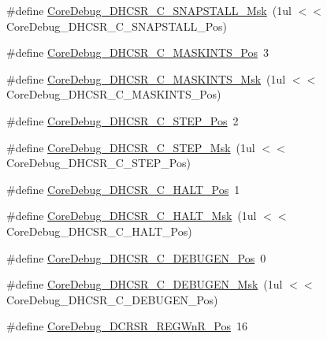 \begin{DoxyCompactItemize}
\item 
\#define \hyperlink{group___c_m_s_i_s___c_m3___core_debug_ga53aa99b2e39a67622f3b9973e079c2b4}{Core\-Debug\-\_\-\-D\-H\-C\-S\-R\-\_\-\-C\-\_\-\-S\-N\-A\-P\-S\-T\-A\-L\-L\-\_\-\-Msk}~(1ul $<$$<$ Core\-Debug\-\_\-\-D\-H\-C\-S\-R\-\_\-\-C\-\_\-\-S\-N\-A\-P\-S\-T\-A\-L\-L\-\_\-\-Pos)
\item 
\#define \hyperlink{group___c_m_s_i_s___c_m3___core_debug_ga0d2907400eb948a4ea3886ca083ec8e3}{Core\-Debug\-\_\-\-D\-H\-C\-S\-R\-\_\-\-C\-\_\-\-M\-A\-S\-K\-I\-N\-T\-S\-\_\-\-Pos}~3
\item 
\#define \hyperlink{group___c_m_s_i_s___c_m3___core_debug_ga77fe1ef3c4a729c1c82fb62a94a51c31}{Core\-Debug\-\_\-\-D\-H\-C\-S\-R\-\_\-\-C\-\_\-\-M\-A\-S\-K\-I\-N\-T\-S\-\_\-\-Msk}~(1ul $<$$<$ Core\-Debug\-\_\-\-D\-H\-C\-S\-R\-\_\-\-C\-\_\-\-M\-A\-S\-K\-I\-N\-T\-S\-\_\-\-Pos)
\item 
\#define \hyperlink{group___c_m_s_i_s___c_m3___core_debug_gae1fc39e80de54c0339cbb1b298a9f0f9}{Core\-Debug\-\_\-\-D\-H\-C\-S\-R\-\_\-\-C\-\_\-\-S\-T\-E\-P\-\_\-\-Pos}~2
\item 
\#define \hyperlink{group___c_m_s_i_s___c_m3___core_debug_gae6bda72fbd32cc5734ff3542170dc00d}{Core\-Debug\-\_\-\-D\-H\-C\-S\-R\-\_\-\-C\-\_\-\-S\-T\-E\-P\-\_\-\-Msk}~(1ul $<$$<$ Core\-Debug\-\_\-\-D\-H\-C\-S\-R\-\_\-\-C\-\_\-\-S\-T\-E\-P\-\_\-\-Pos)
\item 
\#define \hyperlink{group___c_m_s_i_s___c_m3___core_debug_gaddf1d43f8857e4efc3dc4e6b15509692}{Core\-Debug\-\_\-\-D\-H\-C\-S\-R\-\_\-\-C\-\_\-\-H\-A\-L\-T\-\_\-\-Pos}~1
\item 
\#define \hyperlink{group___c_m_s_i_s___c_m3___core_debug_ga1d905a3aa594eb2e8bb78bcc4da05b3f}{Core\-Debug\-\_\-\-D\-H\-C\-S\-R\-\_\-\-C\-\_\-\-H\-A\-L\-T\-\_\-\-Msk}~(1ul $<$$<$ Core\-Debug\-\_\-\-D\-H\-C\-S\-R\-\_\-\-C\-\_\-\-H\-A\-L\-T\-\_\-\-Pos)
\item 
\#define \hyperlink{group___c_m_s_i_s___c_m3___core_debug_gab557abb5b172b74d2cf44efb9d824e4e}{Core\-Debug\-\_\-\-D\-H\-C\-S\-R\-\_\-\-C\-\_\-\-D\-E\-B\-U\-G\-E\-N\-\_\-\-Pos}~0
\item 
\#define \hyperlink{group___c_m_s_i_s___c_m3___core_debug_gab815c741a4fc2a61988cd2fb7594210b}{Core\-Debug\-\_\-\-D\-H\-C\-S\-R\-\_\-\-C\-\_\-\-D\-E\-B\-U\-G\-E\-N\-\_\-\-Msk}~(1ul $<$$<$ Core\-Debug\-\_\-\-D\-H\-C\-S\-R\-\_\-\-C\-\_\-\-D\-E\-B\-U\-G\-E\-N\-\_\-\-Pos)
\item 
\#define \hyperlink{group___c_m_s_i_s___c_m3___core_debug_ga51e75942fc0614bc9bb2c0e96fcdda9a}{Core\-Debug\-\_\-\-D\-C\-R\-S\-R\-\_\-\-R\-E\-G\-Wn\-R\-\_\-\-Pos}~16
$$
\end{DoxyCompactItemize}
